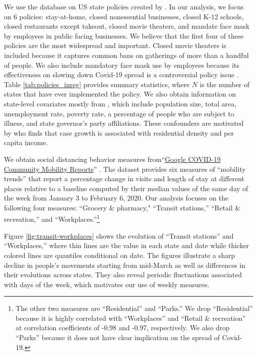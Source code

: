 \documentclass[11pt,reqno,letter]{amsart}
\theoremstyle{definition}
\begin{document}
We use the database on US state policies created by
\cite{raifman2020}.
In our analysis, we focus on 6
policies:  stay-at-home, closed nonessential
businesses, closed K-12 schools, closed restaurants except takeout, closed movie theaters, and mandate face mask by  employees in public facing businesses.
We believe that the first four of these
policies are the most widespread and important.
Closed movie theaters is included because it captures common bans on gatherings of more than
a handful of people. We also include mandatory face mask use by employees because its effectiveness on slowing down Covid-19 spread is a controversial policy issue \citep{howard2020,Greenhalghm2020,zhangr2020}.
Table \ref{tab:policies_inreg} provides summary statistics, where $N$ is the number of states that have ever implemented the policy. We also obtain information on state-level covariates mostly from \citet{raifman2020}, which include population size, total area, unemployment rate, poverty rate,  a percentage of people who are subject to illness, and state governor's party affiliations.  These confounders are motivated by \cite{wheaton2020} who finds that case growth is associated  with residential density and per capita income.





We obtain social distancing behavior measures from``\href{https://www.google.com/covid19/mobility/}{Google COVID-19 Community Mobility Reports}''
\citep{google2020}.  The dataset provides six measures of ``mobility trends''  that report a percentage change in visits and length of stay at different places relative to a baseline computed by their median values of the same day of the week from January 3 to February 6, 2020.  Our analysis focuses on the following four measures: ``Grocery \& pharmacy," ``Transit stations,'' ``Retail \& recreation,'' and ``Workplaces.''\footnote{The other two measures are ``Residential'' and  ``Parks.''  We drop ``Residential'' because it is highly correlated with  ``Workplaces'' and  ``Retail \& recreation''  at correlation coefficients of -0.98 and -0.97, respectively. We also drop ``Parks'' because it does not have clear implication on the spread of Covid-19.}

Figure \ref{fig:transit-workplaces} shows the evolution of  ``Transit stations'' and ``Workplaces,'' where thin lines are the value in each state and date while thicker colored lines are quantiles  conditional on date. The figures illustrate a sharp decline in people's movements starting from mid-March as well as differences in their evolutions across states. They also reveal periodic fluctuations associated with days of the week, which motivates our use of weekly measures.
\end{document}
